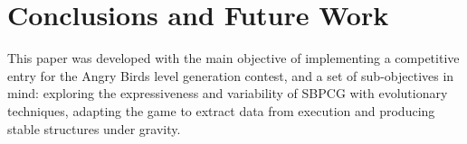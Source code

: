 \documentclass[sigconf]{acmart}
\begin{document}



%
\section{Conclusions and Future Work} 
\label{sec:conclusions}


This paper was developed with the main objective of implementing a
competitive entry for the Angry Birds level generation contest, and  a
set of sub-objectives in mind: exploring the expressiveness and variability of 
SBPCG with evolutionary techniques, adapting the game to extract data from 
execution and producing stable structures under gravity.
\end{document}
